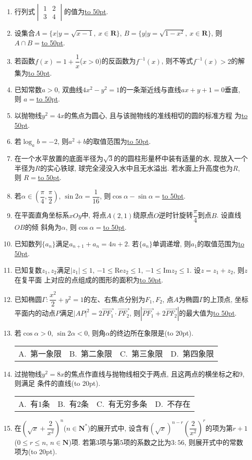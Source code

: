 \documentclass[10pt,a4paper]{article}
\newcommand{\blank}[1]{\underline{\hbox to #1pt{}}}
\newcommand{\bracket}[1]{(\hbox to #1pt{})}
\newcommand{\fourch}[4]{\par\begin{tabular}{p{.23\textwidth}p{.23\textwidth}p{.23\textwidth}p{.23\textwidth}}
A.~#1 &B.~#2& C.~#3& D.~#4
\end{tabular}}
\begin{document}
\begin{enumerate}[1.]
\item 行列式$\begin{vmatrix} 1 & 2 \\ 3 & 4 \end{vmatrix}$的值为\blank{50}.
\item 设集合$A=\{x|y=\sqrt {x-1}, \ x\in \mathbf{R}\}$, $B=\{y|y=\sqrt {1-x^2}, \ x\in \mathbf{R}\}$, 则$A\cap B=$\blank{50}.
\item 若函数$f(x)=1+\dfrac 1x$($x>0$)的反函数为$f^{-1}(x)$, 则不等式$f^{-1}(x)>2$的解集为\blank{50}.
\item 已知常数$a>0$, 双曲线$4x^2-y^2=1$的一条渐近线与直线$ax+y+1=0$垂直, 则	$a=$\blank{50}.
\item 以抛物线$y^2=4x$的焦点为圆心, 且与该抛物线的准线相切的圆的标准方程	为\blank{50}.
\item 若$\log_ab=-2$, 则$a^2+b$的取值范围为\blank{50}.
\item 在一个水平放置的底面半径为$\sqrt 3$的的圆柱形量杯中装有适量的水, 现放入一个半径为$R$的实心铁球, 球完全浸没入水中且无水溢出. 若水面上升高度也为$R$, 则	$R=$\blank{50}.
\item 若$\alpha \in (\dfrac{\pi}4,\dfrac{\pi}2)$, $\sin 2\alpha =\dfrac 1{16}$, 则$\cos \alpha -\sin \alpha =$\blank{50}.
\item 在平面直角坐标系$xOy$中, 将点$A(2,1)$绕原点$O$逆时针旋转$\dfrac{\pi}4$到点$B$. 设直线$OB$的倾	斜角为$\alpha$, 则$\cos \alpha =$\blank{50}.
\item 已知数列$\{a_n\}$满足$a_{n+1}+a_n=4n+2$. 若$\{a_n\}$单调递增, 则$a_1$的取值范围为\blank{50}.
\item 已知复数$z_1,z_2$满足$|z_1|\le 1$, $-1\le \text{Re}z_2\le 1$, $-1\le \mathrm{Im}z_2\le 1$. 设$z=z_1+z_2$, 则$z$在复平面	上对应的点组成的图形的面积为\blank{50}.
\item 已知椭圆$\Gamma:\dfrac{x^2}2+y^2=1$的左、右焦点分别为$F_1,F_2$, 点$A$为椭圆$\Gamma$的上顶点, 坐标平面内的动点$P$满足$|AP|^2=2\overrightarrow{PF_1}\cdot \overrightarrow{PF_2}$, 则$|\overrightarrow{PF_1}+2\overrightarrow{PF_2}|$的最大值为\blank{50}.
\item 若$\cos \alpha >0$, $\sin 2\alpha <0$, 则角$\alpha$的终边所在象限是\bracket{20}.
\fourch{第一象限}{第二象限}{第三象限}{第四象限}
\item 过抛物线$y^2=8x$的焦点作直线与抛物线相交于两点, 且这两点的横坐标之和$9$, 则满足	条件的直线\bracket{20}.
\fourch{有$1$条}{有$2$条}{有无穷多条}{不存在}
\item 在$(\sqrt x+\dfrac 2{x^2})^n$($n\in \mathbf{N}^*$)的展开式中, 设含有$(\sqrt x)^{n-r}(\dfrac 2{x^2})^r$的项为第$r+1$($0\le r\le n$, $n\in \mathbf{N}$)项. 若第$3$项与第$5$项的系数之比为$3:56$, 则展开式中的常数项为\bracket{20}.

\end{enumerate}
\end{document}
